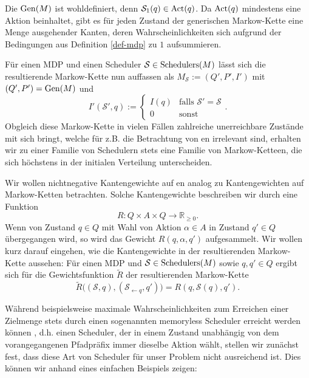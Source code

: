\documentclass[a4paper]{article}
\newcommand{\mc}{Markow-Kette}
\theoremstyle{nonumberplain}
\begin{document}
	Die \gmc{} $\mathrm{Gen}(M)$ ist wohldefiniert, denn $\mathcal{S}_1(q) \in \mathrm{Act}(q)$. Da $\mathrm{Act}(q)$ mindestens eine Aktion beinhaltet, gibt es für jeden Zustand der generischen \mc{} eine Menge ausgehender Kanten, deren Wahrscheinlichkeiten sich aufgrund der Bedingungen aus Definition \ref{def-mdp} zu $1$ aufsummieren. 
	
	Für einen MDP \mdpex{} und einen Scheduler $\mathcal{S}\in \mathrm{Schedulers}(M)$ lässt sich die resultierende \mc{} nun auffassen als $M_\mathcal{S} := (Q',P',I')$ mit $(Q',P') = \mathrm{Gen}(M)$ und
	\begin{equation}
	I'(\mathcal{S}',q) := \begin{cases}
	I(q) & \text{falls }\mathcal{S}'=\mathcal{S}\\
	0 & \text{sonst}
	\end{cases}\text{.}
	\end{equation}
	Obgleich diese \mc{} in vielen Fällen zahlreiche unerreichbare Zustände mit sich bringt, welche für z.B. die Betrachtung von \var{}en irrelevant sind, erhalten wir zu einer Familie von Schedulern stets eine Familie von \mc{}en, die sich höchstens in der initialen Verteilung unterscheiden.
	
	Wir wollen nichtnegative Kantengewichte auf \mdp{}en analog zu Kantengewichten auf \mc{}n betrachten. Solche Kantengewichte beschreiben wir durch eine Funktion
	\begin{equation}
	R : Q \times A \times Q \to \mathbb{R}_{\geq 0}\text{.}
	\end{equation}
	Wenn von Zustand $q\in Q$ mit Wahl von Aktion $\alpha\in A$ in Zustand $q'\in Q$ übergegangen wird, so wird das Gewicht $R(q,\alpha,q')$ aufgesammelt. 
	Wir wollen kurz darauf eingehen, wie die Kantengewichte in der resultierenden \mc{} aussehen: Für einen MDP \mdpex{} und $\mathcal{S} \in \mathrm{Schedulers}(M)$ sowie $q,q' \in Q$ ergibt sich für die Gewichtsfunktion $\tilde{R}$ der resultierenden \mc{}
	\begin{equation}
	\tilde{R}\big((\mathcal{S},q), (\mathcal{S}_{\leftarrow q},q')\big) = R(q,\mathcal{S}(q),q') \text{.}
	\end{equation}
	
	
	Während beispielsweise maximale Wahrscheinlichkeiten zum Erreichen einer Zielmenge stets durch einen sogenannten memoryless Scheduler erreicht werden können \cite{Bai08}, d.h. einen Scheduler, der in einem Zustand unabhängig von dem vorangegangenen Pfadpräfix immer dieselbe Aktion wählt, stellen wir zunächst fest, dass diese Art von Scheduler für unser Problem nicht ausreichend ist. Dies können wir anhand eines einfachen Beispiels zeigen:
	
\end{document}
